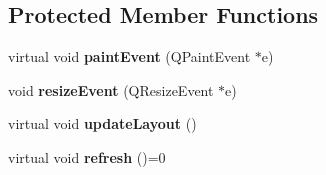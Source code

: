 \subsection*{Protected Member Functions}
\begin{DoxyCompactItemize}
\item 
\hypertarget{class_graph_view_results_a33052e94aa87524bd42096fdd6021611}{virtual void {\bfseries paint\-Event} (Q\-Paint\-Event $\ast$e)}\label{class_graph_view_results_a33052e94aa87524bd42096fdd6021611}

\item 
\hypertarget{class_graph_view_results_a69ee90a26c663efd665fe3434c110f3e}{void {\bfseries resize\-Event} (Q\-Resize\-Event $\ast$e)}\label{class_graph_view_results_a69ee90a26c663efd665fe3434c110f3e}

\item 
\hypertarget{class_graph_view_results_a9e0786ef752718a0daa0563ceaddc45a}{virtual void {\bfseries update\-Layout} ()}\label{class_graph_view_results_a9e0786ef752718a0daa0563ceaddc45a}

\item 
\hypertarget{class_graph_view_results_a83257e5999a77450994b150890284c6f}{virtual void {\bfseries refresh} ()=0}\label{class_graph_view_results_a83257e5999a77450994b150890284c6f}

\end{DoxyCompactItemize}
